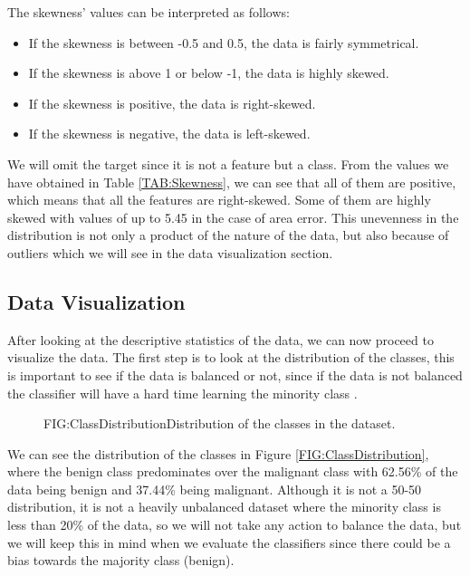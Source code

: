 The skewness' values can be interpreted as follows:
\begin{itemize}
    \item If the skewness is between -0.5 and 0.5, the data is fairly symmetrical.
    \item If the skewness is above 1 or below -1, the data is highly skewed.
    \item If the skewness is positive, the data is right-skewed.
    \item If the skewness is negative, the data is left-skewed.
\end{itemize}

We will omit the target since it is not a feature but a class. From the values we have obtained in Table \ref{TAB:Skewness}, we can see that all of them are positive, which means that all the features are right-skewed. Some of them are highly skewed with values of up to 5.45 in the case of area error. This unevenness in the distribution is not only a product of the nature of the data, but also because of outliers which we will see in the data visualization section.

\subsection{Data Visualization}

After looking at the descriptive statistics of the data, we can now proceed to visualize the data. The first step is to look at the distribution of the classes, this is important to see if the data is balanced or not, since if the data is not balanced the classifier will have a hard time learning the minority class \cite{he_learning_2009}.



\begin{figure}[Class Distribution]{FIG:ClassDistribution}{Distribution of the classes in the dataset.}
\end{figure}

We can see the distribution of the classes in Figure \ref{FIG:ClassDistribution}, where the benign class predominates over the malignant class with 62.56\% of the data being benign and 37.44\% being malignant. Although it is not a 50-50 distribution, it is not a heavily unbalanced dataset where the minority class is less than 20\% of the data, so we will not take any action to balance the data, but we will keep this in mind when we evaluate the classifiers since there could be a bias towards the majority class (benign).

